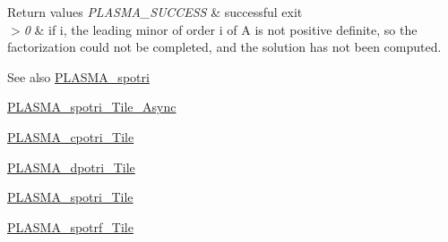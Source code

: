 \begin{DoxyRetVals}{Return values}
{\em P\+L\+A\+S\+M\+A\+\_\+\+S\+U\+C\+C\+E\+S\+S} & successful exit \\
\hline
{\em $>$0} & if i, the leading minor of order i of A is not positive definite, so the factorization could not be completed, and the solution has not been computed.\\
\hline
\end{DoxyRetVals}
\begin{DoxySeeAlso}{See also}
\hyperlink{group__float_gaf35cf8d73bf326a683f4be4943ef9b38_gaf35cf8d73bf326a683f4be4943ef9b38}{P\+L\+A\+S\+M\+A\+\_\+spotri} 

\hyperlink{group__float__Tile__Async_ga8069a24dfebe70194fa0bd6e9bb8ed62_ga8069a24dfebe70194fa0bd6e9bb8ed62}{P\+L\+A\+S\+M\+A\+\_\+spotri\+\_\+\+Tile\+\_\+\+Async} 

\hyperlink{group__PLASMA__Complex32__t__Tile_gaceabc04acf5032a6a9e0415cab2e5abe_gaceabc04acf5032a6a9e0415cab2e5abe}{P\+L\+A\+S\+M\+A\+\_\+cpotri\+\_\+\+Tile} 

\hyperlink{group__double__Tile_gab78b1dc223af4cceea99502e98e9fb72_gab78b1dc223af4cceea99502e98e9fb72}{P\+L\+A\+S\+M\+A\+\_\+dpotri\+\_\+\+Tile} 

\hyperlink{group__float__Tile_ga3f2b23232748f3fde3e58d06757af2ff_ga3f2b23232748f3fde3e58d06757af2ff}{P\+L\+A\+S\+M\+A\+\_\+spotri\+\_\+\+Tile} 

\hyperlink{group__float__Tile_ga0518a079c049cdcd32b8ae408e0d5e28_ga0518a079c049cdcd32b8ae408e0d5e28}{P\+L\+A\+S\+M\+A\+\_\+spotrf\+\_\+\+Tile} 
\end{DoxySeeAlso}
\hypertarget{group__float__Tile_gaf5ba3c807c89d3363ea8cf648b11b40d_gaf5ba3c807c89d3363ea8cf648b11b40d}{}
